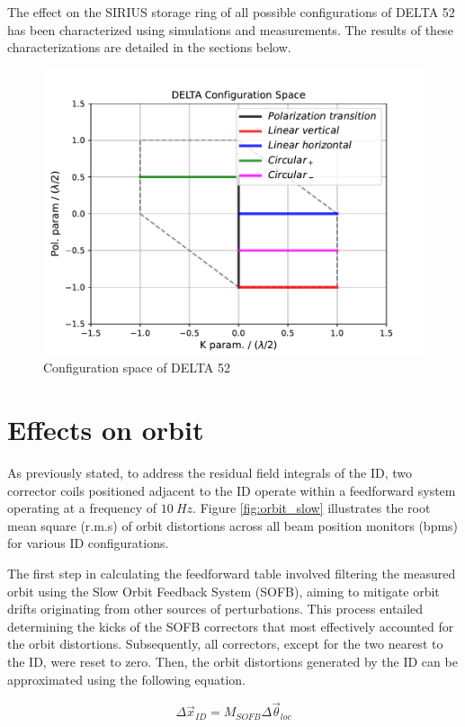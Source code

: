 \documentclass[a4paper,
               keeplastbox,   %
               ]{jacow}
\begin{document}
The effect on the SIRIUS storage ring of all possible configurations of DELTA 52 has been characterized using simulations and measurements. The results of these characterizations are detailed in the sections below.

\begin{figure}[]
    \centering
   \includegraphics[width=.8\columnwidth]{config_space.pdf}
   \caption{Configuration space of DELTA 52}
   \label{fig:config_space}
\end{figure}

\section{Effects on orbit}

As previously stated, to address the residual field integrals of the ID, two corrector coils positioned adjacent to the ID operate within a feedforward system operating at a frequency of $\SI{10}{Hz}$. Figure \ref{fig:orbit_slow} illustrates the root mean square (r.m.s) of orbit distortions across all beam position monitors (bpms) for various ID configurations.

The first step in calculating the feedforward table involved filtering the measured orbit using the Slow Orbit Feedback System (SOFB), aiming to mitigate orbit drifts originating from other sources of perturbations. This process entailed determining the kicks of the SOFB correctors that most effectively accounted for the orbit distortions. Subsequently, all correctors, except for the two nearest to the ID, were reset to zero. Then, the orbit distortions generated by the ID can be approximated using the following equation.

\begin{equation}
    \Delta\Vec{x}_{ID} = M_{SOFB}\Delta\Vec{\theta}_{loc}
\end{equation}
\end{document}
